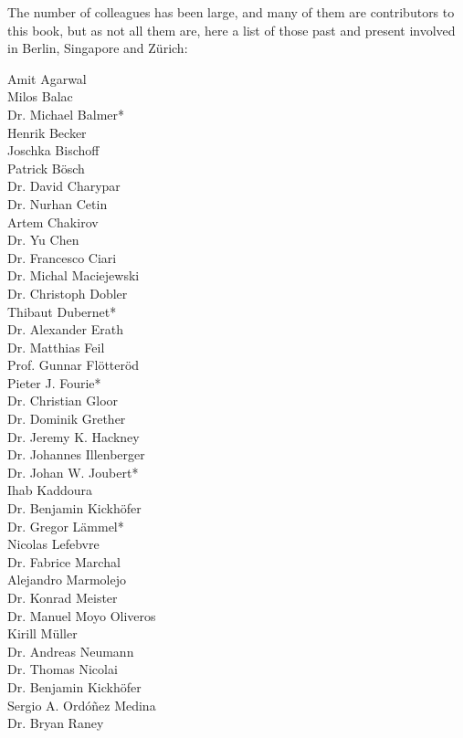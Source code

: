 The number of colleagues has been large, and many of them are contributors to this book, but as not all them are, here a list of those past and present involved in Berlin, Singapore and Zürich:  

\begin{multicols}{3}
Amit Agarwal \\
Milos Balac  \\
Dr. Michael Balmer\mbox{*} \\
Henrik Becker \\
Joschka Bischoff \\
Patrick Bösch \\
Dr. David Charypar \\
Dr. Nurhan Cetin  \\
Artem Chakirov \\
Dr. Yu Chen \\
Dr. Francesco Ciari \\
Dr. Michal Maciejewski \\
Dr. Christoph Dobler \\
Thibaut Dubernet\mbox{*} \\
Dr. Alexander Erath \\
Dr. Matthias Feil \\
Prof. Gunnar Flötteröd \\
Pieter J. Fourie\mbox{*} \\
Dr. Christian Gloor \\
Dr. Dominik Grether \\
Dr. Jeremy K. Hackney \\
Dr. Johannes Illenberger \\
Dr. Johan W. Joubert\mbox{*} \\
Ihab Kaddoura \\
Dr. Benjamin Kickhöfer \\
Dr. Gregor Lämmel\mbox{*} \\
Nicolas Lefebvre \\
Dr. Fabrice Marchal \\
Alejandro Marmolejo \\
Dr. Konrad Meister \\
Dr. Manuel Moyo Oliveros \\
Kirill Müller \\
Dr. Andreas Neumann \\
Dr. Thomas Nicolai \\
Dr. Benjamin Kickhöfer \\
Sergio A. Ordóñez Medina \\
Dr. Bryan Raney \\

\end{multicols}
